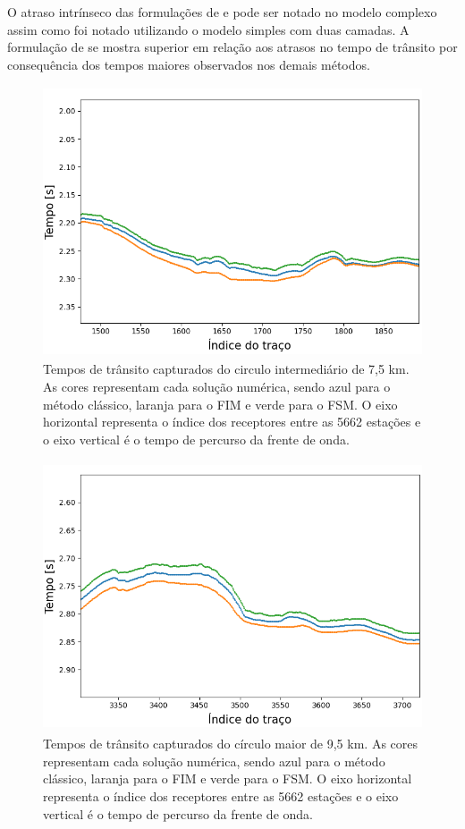 O atraso intrínseco das formulações de  e  pode ser notado no modelo complexo assim como foi notado utilizando o modelo simples com duas camadas. A formulação de  se mostra superior em relação aos atrasos no tempo de trânsito por consequência dos tempos maiores observados nos demais métodos.

\begin{figure}[H]
	\centering
	\includegraphics[height=8cm,width=13cm]{Imgs/Resultados/complex_w2.png}	
	\caption{Tempos de trânsito capturados do circulo intermediário de 7,5 km. As cores representam cada solução numérica, sendo azul para o método clássico, laranja para o FIM e verde para o FSM. O eixo horizontal representa o índice dos receptores entre as 5662 estações e o eixo vertical é o tempo de percurso da frente de onda.}
	\label{fig:overthrust_mid_circle}
\end{figure}

\begin{figure}[H]
	\centering
	\includegraphics[height=8cm,width=13cm]{Imgs/Resultados/complex_w3.png} \newline 
	
	\caption{Tempos de trânsito capturados do círculo maior de 9,5 km. As cores representam cada solução numérica, sendo azul para o método clássico, laranja para o FIM e verde para o FSM. O eixo horizontal representa o índice dos receptores entre as 5662 estações e o eixo vertical é o tempo de percurso da frente de onda.}
	\label{fig:overthrust_outer_circle}
\end{figure}

